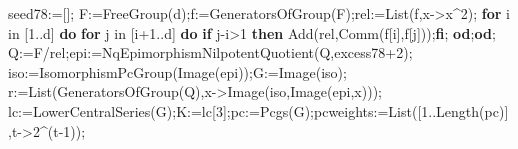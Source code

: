 \documentclass[
  10pt,
  letterpaper,
]{article}
\newenvironment{Shaded}{}{}
\newcommand{\BuiltInTok}[1]{\textcolor[rgb]{0.00,0.50,0.00}{#1}}
\newcommand{\ControlFlowTok}[1]{\textcolor[rgb]{0.00,0.44,0.13}{\textbf{#1}}}
\newcommand{\ExtensionTok}[1]{#1}
\newcommand{\FloatTok}[1]{\textcolor[rgb]{0.25,0.63,0.44}{#1}}
\newcommand{\NormalTok}[1]{#1}
\newcommand{\OperatorTok}[1]{\textcolor[rgb]{0.40,0.40,0.40}{#1}}
\newcommand{\VariableTok}[1]{\textcolor[rgb]{0.10,0.09,0.49}{#1}}
\begin{document}
\begin{Shaded}
\begin{Highlighting}[]
 \VariableTok{seed78}\OperatorTok{:=}\NormalTok{[]}\OperatorTok{;}
 \VariableTok{F}\OperatorTok{:=}\BuiltInTok{FreeGroup}\NormalTok{(}\VariableTok{d}\NormalTok{)}\OperatorTok{;}\VariableTok{f}\OperatorTok{:=}\BuiltInTok{GeneratorsOfGroup}\NormalTok{(}\VariableTok{F}\NormalTok{)}\OperatorTok{;}\VariableTok{rel}\OperatorTok{:=}\BuiltInTok{List}\NormalTok{(}\VariableTok{f}\OperatorTok{,}\VariableTok{x}\OperatorTok{{-}\textgreater{}}\VariableTok{x}\OperatorTok{\^{}}\FloatTok{2}\NormalTok{)}\OperatorTok{;}
 \ControlFlowTok{for} \VariableTok{i} \ExtensionTok{in}\NormalTok{ [}\FloatTok{1}\OperatorTok{..}\VariableTok{d}\NormalTok{] }\ControlFlowTok{do} \ControlFlowTok{for} \VariableTok{j} \ExtensionTok{in}\NormalTok{ [}\VariableTok{i}\OperatorTok{+}\FloatTok{1}\OperatorTok{..}\VariableTok{d}\NormalTok{] }\ControlFlowTok{do}
  \ControlFlowTok{if} \VariableTok{j}\OperatorTok{{-}}\VariableTok{i}\OperatorTok{\textgreater{}}\FloatTok{1} \ControlFlowTok{then} \BuiltInTok{Add}\NormalTok{(}\VariableTok{rel}\OperatorTok{,}\BuiltInTok{Comm}\NormalTok{(}\VariableTok{f}\NormalTok{[}\VariableTok{i}\NormalTok{]}\OperatorTok{,}\VariableTok{f}\NormalTok{[}\VariableTok{j}\NormalTok{]))}\OperatorTok{;}\ControlFlowTok{fi}\OperatorTok{;}
 \ControlFlowTok{od}\OperatorTok{;}\ControlFlowTok{od}\OperatorTok{;}
 \VariableTok{Q}\OperatorTok{:=}\VariableTok{F}\OperatorTok{/}\VariableTok{rel}\OperatorTok{;}\VariableTok{epi}\OperatorTok{:=}\VariableTok{NqEpimorphismNilpotentQuotient}\NormalTok{(}\VariableTok{Q}\OperatorTok{,}\VariableTok{excess78}\OperatorTok{+}\FloatTok{2}\NormalTok{)}\OperatorTok{;}
 \VariableTok{iso}\OperatorTok{:=}\BuiltInTok{IsomorphismPcGroup}\NormalTok{(}\BuiltInTok{Image}\NormalTok{(}\VariableTok{epi}\NormalTok{))}\OperatorTok{;}\VariableTok{G}\OperatorTok{:=}\BuiltInTok{Image}\NormalTok{(}\VariableTok{iso}\NormalTok{)}\OperatorTok{;}
 \VariableTok{r}\OperatorTok{:=}\BuiltInTok{List}\NormalTok{(}\BuiltInTok{GeneratorsOfGroup}\NormalTok{(}\VariableTok{Q}\NormalTok{)}\OperatorTok{,}\VariableTok{x}\OperatorTok{{-}\textgreater{}}\BuiltInTok{Image}\NormalTok{(}\VariableTok{iso}\OperatorTok{,}\BuiltInTok{Image}\NormalTok{(}\VariableTok{epi}\OperatorTok{,}\VariableTok{x}\NormalTok{)))}\OperatorTok{;}
 \VariableTok{lc}\OperatorTok{:=}\BuiltInTok{LowerCentralSeries}\NormalTok{(}\VariableTok{G}\NormalTok{)}\OperatorTok{;}\VariableTok{K}\OperatorTok{:=}\VariableTok{lc}\NormalTok{[}\FloatTok{3}\NormalTok{]}\OperatorTok{;}\VariableTok{pc}\OperatorTok{:=}\BuiltInTok{Pcgs}\NormalTok{(}\VariableTok{G}\NormalTok{)}\OperatorTok{;}\VariableTok{pcweights}\OperatorTok{:=}\BuiltInTok{List}\NormalTok{([}\FloatTok{1}\OperatorTok{..}\BuiltInTok{Length}\NormalTok{(}\VariableTok{pc}\NormalTok{)]}\OperatorTok{,}\VariableTok{t}\OperatorTok{{-}\textgreater{}}\FloatTok{2}\OperatorTok{\^{}}\NormalTok{(}\VariableTok{t}\OperatorTok{{-}}\FloatTok{1}\NormalTok{))}\OperatorTok{;}

\end{Highlighting}
\end{Shaded}
\end{document}
